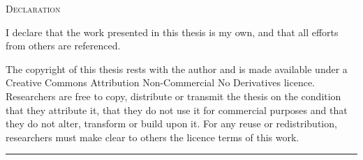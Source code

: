 \vspace*{140px} %
\begin{center}
\textsc{\LARGE Declaration}
\end{center}
I declare that the work presented in this thesis is my own, and that all efforts from others are referenced. 

The copyright of this thesis rests with the author and is made available under a Creative Commons Attribution Non-Commercial No Derivatives licence. Researchers are free to copy, distribute or transmit the thesis on the condition that they attribute it, that they do not use it for commercial purposes and that they do not alter, transform or build upon it. For any reuse or redistribution, researchers must make clear to others the licence terms of this work. 

\begin{center}
\rule{125px}{0.2px}
\end{center}
\vfill
\pagebreak